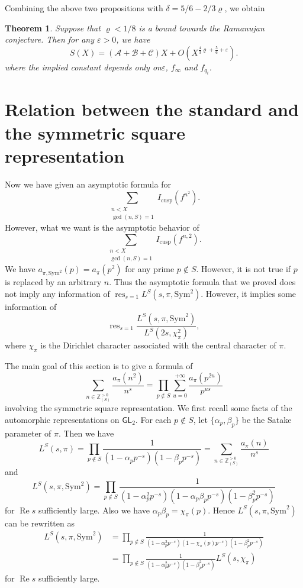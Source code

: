 \documentclass[10pt,oneside,reqno]{amsart}
\newcommand\ZZ{\mathbb{Z}}
\newcommand\ms[1]{\mathscr{#1}}
\newcommand\GL{\mathsf{GL}}
\renewcommand\Re{\mathop{\mathrm{Re}}}
\DeclareMathOperator\res{res}
\newcommand\cusp{\mathrm{cusp}}
\newcommand\Sym{\mathrm{Sym}}
\theoremstyle{THEOREM}
\newtheorem{theorem}{Theorem}[section]
\theoremstyle{DEFINITION}
\theoremstyle{EXERCISE}
\numberwithin{equation}{section}
\begin{document}
Combining the above two propositions with $\delta=5/6-2/3\varrho$, we obtain
\begin{theorem}\label{thm:contributionfinal}
Suppose that $\varrho<1/8$ is a bound towards the Ramanujan conjecture. Then for any $\varepsilon>0$, we have
\[
S(X)=(\ms{A}+\ms{B}+\ms{C})X+O(X^{\frac43\varrho+\frac56+\varepsilon}).
\] 
where the implied constant depends only on$\varepsilon$, $f_\infty$ and $f_{q_i}$.
\end{theorem}

\section{Relation between the standard and the symmetric square representation}\label{sec:sym2std}
Now we have given an asymptotic formula for
\[
\sum_{\substack{n<X\\ \gcd(n,S)=1}}I_\cusp(f^{n^2}).
\]
However, what we want is the asymptotic behavior of
\[
\sum_{\substack{n<X\\ \gcd(n,S)=1}}I_\cusp(f^{n,2}).
\]
We have $a_{\pi,\mathrm{Sym}^2}(p)=a_\pi(p^2)$ for any prime $p\notin S$. However, it is not true if $p$ is replaced by an arbitrary $n$. Thus the asymptotic formula that we proved does not imply any information of $\res_{s=1}L^S(s,\pi,\mathrm{Sym}^2)$. However, it implies some information of
\[
\res_{s=1}\frac{L^S(s,\pi,\mathrm{Sym}^2)}{L^S(2s,\chi_\pi^2)},
\]
where $\chi_\pi$ is the Dirichlet character associated with the central character of $\pi$.

The main goal of this section is to give a formula of
\[
\sum_{n\in \ZZ_{(S)}^{>0}}\frac{a_{\pi}(n^2)}{n^s}=\prod_{p\notin S}\sum_{u=0}^{+\infty}\frac{a_\pi(p^{2u})}{p^{us}}
\]
involving the symmetric square representation. We first recall some facts of the automorphic representations on $\GL_2$. For each $p\notin S$, let $\{\alpha_p,\beta_p\}$ be the Satake parameter of $\pi$. Then we have
\begin{equation}\label{eq:standardrep}
L^S(s,\pi)=\prod_{p\notin S}\frac{1}{(1-\alpha_pp^{-s})(1-\beta_pp^{-s})}=\sum_{n\in \ZZ_{(S)}^{>0}}\frac{a_\pi(n)}{n^s}
\end{equation}
and
\[
L^S(s,\pi,\Sym^2)=\prod_{p\notin S}\frac{1}{(1-\alpha_p^2p^{-s})(1-\alpha_p\beta_pp^{-s})(1-\beta_p^2p^{-s})}
\]
for $\Re s$ sufficiently large.
Also we have $\alpha_p\beta_p=\chi_\pi(p)$. Hence $L^S(s,\pi,\Sym^2)$ can be rewritten as
\begin{equation}\label{eq:symrep}
\begin{split}
L^S(s,\pi,\Sym^2)&=\prod_{p\notin S}\frac{1}{(1-\alpha_p^2p^{-s})(1-\chi_\pi(p)p^{-s})(1-\beta_p^2p^{-s})}\\
&=\prod_{p\notin S}\frac{1}{(1-\alpha_p^2p^{-s})(1-\beta_p^2p^{-s})}L^S(s,\chi_\pi)
\end{split}
\end{equation}
for $\Re s$ sufficiently large.
\end{document}
